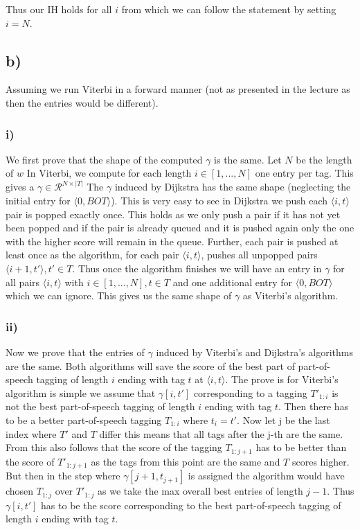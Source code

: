 \documentclass[a4paper,12pt]{ETHexercise}
\begin{document}
Thus our IH holds for all $i$ from which we can follow the statement by setting $i = N$.

\subsection*{b)}
Assuming we run Viterbi in a forward manner (not as presented in the lecture as then the entries would be different).

\subsubsection*{i)}
We first prove that the shape of the computed $\gamma$ is the same.
Let $N$ be the length of $w$
In Viterbi, we compute for each length $i \in [1,...,N] $ one entry per tag. This gives a $\gamma \in \mathcal{R}^{N \times |T|}$
The $\gamma$ induced by Dijkstra has the same shape (neglecting the initial entry for $\langle 0, BOT\rangle$).
This is very easy to see in Dijkstra we push each $\langle i, t\rangle$ pair is popped exactly once. This holds as we only push a pair if it has not yet been popped and if the pair is already queued and it is pushed again only the one with the higher score will remain in the queue.
Further, each pair is pushed at least once as the algorithm, for each pair $\langle i, t\rangle$, pushes all unpopped pairs $\langle i+1, t'\rangle, t' \in T$.
Thus once the algorithm finishes we will have an entry in $\gamma$ for all pairs $\langle i, t\rangle$ with $i \in [1,...,N], t \in T$ and one additional entry for $\langle 0, BOT\rangle$ which we can ignore.
This gives us the same shape of $\gamma$ as Viterbi's algorithm.

\subsubsection*{ii)}
Now we prove that the entries of $\gamma$ induced by Viterbi's and Dijkstra's algorithms are the same.
Both algorithms will save the score of the best part of part-of-speech tagging of length $i$ ending with tag $t$ at $\langle i, t\rangle$.
The prove is for Viterbi's algorithm is simple we assume that $\gamma[i,t']$ corresponding to a tagging $T'_{1:i}$ is not the best part-of-speech tagging of length $i$ ending with tag $t$. Then there has to be a better part-of-speech tagging $T_{1:i}$  where $t_i = t'$. Now let j be the last index where $T'$ and $T$ differ this means that all tags after the j-th are the same. From this also follows that the score of the tagging $T_{1:j+1}$ has to be better than the score of $T'_{1:j+1}$ as the tags from this point are the same and $T$ scores higher. But then in the step where $\gamma[j+1, t_{j+1}]$ is assigned the algorithm would have chosen $T_{1:j}$ over $T'_{1:j}$ as we take the max overall best entries of length $j-1$. Thus $\gamma[i,t']$ has to be the score corresponding to the best part-of-speech tagging of length $i$ ending with tag $t$.
\end{document}

